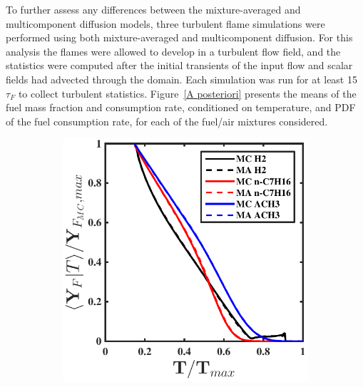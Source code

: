 \documentclass[preprint,review,12pt]{elsarticle}
\begin{document}
To further assess any differences between the mixture-averaged and multicomponent diffusion models, three turbulent flame simulations were performed using both mixture-averaged and multicomponent diffusion.
For this analysis the flames were allowed to develop in a turbulent flow field, and the statistics were computed after the initial transients of the input flow and scalar fields had advected through the domain.
Each simulation was run for at least 15 $\tau_F$ to collect turbulent statistics.
Figure~\ref{A posteriori} presents the means of the fuel mass fraction and consumption rate, conditioned on temperature, and PDF of the fuel consumption rate, for each of the fuel/air mixtures considered.
\begin{figure}[htb]
    \begin{subfigure}{0.33\textwidth}
        \centering
            \includegraphics[width=\textwidth]{condmean_massfrac.pdf}
        \caption{}\label{A posteriori  (a)}
    \end{subfigure}
    \begin{subfigure}{0.33\textwidth}
        \centering

\end{subfigure}
\end{figure}
\end{document}
